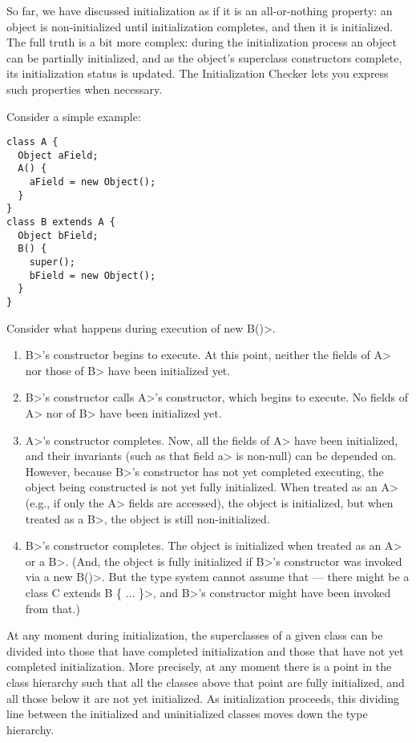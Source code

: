 
So far, we have discussed initialization as if it is an all-or-nothing property:
an object is non-initialized until initialization completes, and then it is initialized.  The full truth is a bit more complex:  during the
initialization process an object can be partially initialized, and as the
object's superclass constructors complete, its initialization status is updated.  The
Initialization Checker lets you express such properties when necessary.

Consider a simple example:

\begin{Verbatim}
class A {
  Object aField;
  A() {
    aField = new Object();
  }
}
class B extends A {
  Object bField;
  B() {
    super();
    bField = new Object();
  }
}
\end{Verbatim}

Consider what happens during execution of \<new B()>.

\begin{enumerate}
\item \<B>'s constructor begins to execute.  At this point, neither the
  fields of \<A> nor those of \<B> have been initialized yet.
\item \<B>'s constructor calls \<A>'s constructor, which begins to execute.
  No fields of \<A> nor of \<B> have been initialized yet.
\item \<A>'s constructor completes.  Now, all the fields of \<A> have been
  initialized, and their invariants (such as that field \<a> is non-null) can be
  depended on.  However, because \<B>'s constructor has not yet completed
  executing, the object being constructed is not yet fully initialized.
  When treated as an \<A> (e.g., if only the \<A> fields are accessed), the
  object is initialized, but when treated as a \<B>, the object
  is still non-initialized.
\item \<B>'s constructor completes.  The object is initialized when treated
  as an \<A> or a \<B>.  (And, the object is fully initialized
   if \<B>'s constructor was invoked via a \<new B()>.  But the type system
   cannot assume that --- there might be a \<class C extends B \{
  ... \}>, and \<B>'s constructor might have been invoked from that.)
\end{enumerate}

At any moment during initialization, the superclasses of a given class
can be divided into those that have completed initialization and those that
have not yet completed initialization.  More precisely, at any moment there
is a point in the class hierarchy such that all the classes above that
point are fully initialized, and all those below it are not yet
initialized.  As initialization proceeds, this dividing line between the
initialized and uninitialized classes moves down the type hierarchy.

